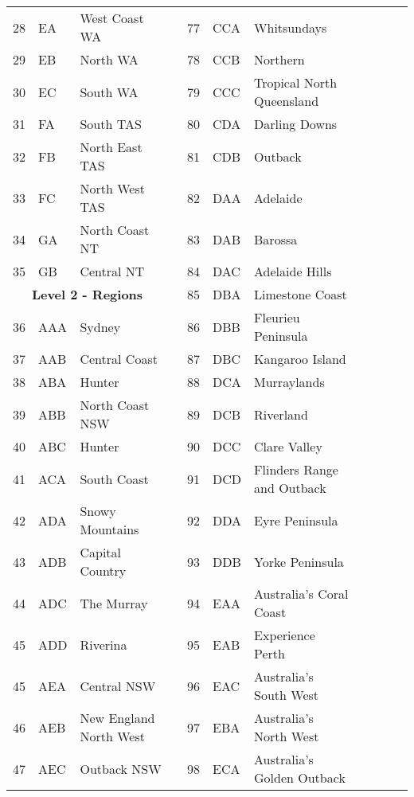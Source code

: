 \begin{table}
{\begin{tabular}{lllllllllll}
				28	& EA & West Coast WA 	& & 77  & CCA & Whitsundays &&&&\\	
				29	& EB & North WA			& & 78  & CCB & Northern &&&&\\	
				30	& EC & South WA 		& & 79  & CCC & Tropical North Queensland &&&&\\	
				31	& FA & South TAS		& & 80  & CDA & Darling Downs &&&&\\
				32	& FB & North East TAS	& & 81  & CDB & Outback &&&&\\	
				33	& FC & North West TAS	& & 82  & DAA & Adelaide &&&&\\
				34	& GA & North Coast NT	& & 83  & DAB & Barossa &&&&\\
				35	& GB & Central NT		& & 84  & DAC & Adelaide Hills &&&&\\
				\cmidrule(lr){1-3}
				\multicolumn{3}{c}{\textbf{Level 2 - Regions}} & & 85  & DBA & Limestone Coast &&&&\\
				\cmidrule(lr){1-3}
				36	& AAA & Sydney 			& 	& 86  & DBB & Fleurieu Peninsula &&&&\\
				37	& AAB & Central Coast	&	& 87  & DBC & Kangaroo Island &&&&\\
				38  & ABA & Hunter 			& 	& 88  & DCA & Murraylands &&&&\\
				39  & ABB & North Coast NSW & 	& 89  & DCB & Riverland &&&&\\
				40  & ABC & Hunter			& 	& 90  & DCC & Clare Valley &&&&\\
				41  & ACA & South Coast		& 	& 91  & DCD & Flinders Range and Outback &&&&\\
				42  & ADA & Snowy Mountains & 	& 92  & DDA & Eyre Peninsula &&&&\\
				43  & ADB & Capital Country & 	& 93  & DDB & Yorke Peninsula &&&&\\
				44  & ADC & The Murray 		& 	& 94  & EAA & Australia's Coral Coast &&&&\\
				45  & ADD & Riverina 		& 	& 95  & EAB & Experience Perth &&&&\\
				45  & AEA & Central NSW 	& 	& 96  & EAC & Australia's South West &&&&\\
				46  & AEB & New England North West &  & 97  & EBA & Australia's North West &&&&\\
				47  & AEC & Outback NSW & & 98  & ECA & Australia's Golden Outback &&&&\\
				\bottomrule
			\end{tabular}
		}
\end{table}

